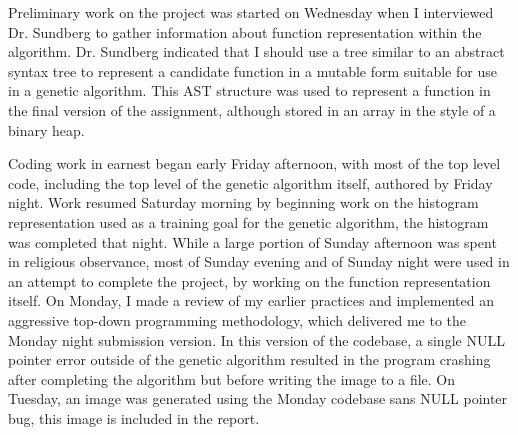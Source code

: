 \documentclass{article}
\begin{document}


Preliminary work on the project was started on Wednesday when I interviewed Dr. Sundberg to gather information about function representation within the algorithm.
Dr. Sundberg indicated that I should use a tree similar to an abstract syntax tree to represent a candidate function in a mutable form suitable for use in a genetic algorithm.
This AST structure was used to represent a function in the final version of the assignment, although stored in an array in the style of a binary heap.

Coding work in earnest began early Friday afternoon, with most of the top level code, including the top level of the genetic algorithm itself, authored by Friday night.
Work resumed Saturday morning by beginning work on the histogram representation used as a training goal for the genetic algorithm, the histogram was completed that night.
While a large portion of Sunday afternoon was spent in religious observance, most of Sunday evening and of Sunday night were used in an attempt to complete the project, by working on the function representation itself.
On Monday, I made a review of my earlier practices and implemented an aggressive top-down programming methodology, which delivered me to the Monday night submission version.
In this version of the codebase, a single NULL pointer error outside of the genetic algorithm resulted in the program crashing after completing the algorithm but before writing the image to a file.
On Tuesday, an image was generated using the Monday codebase sans NULL pointer bug, this image is included in the report.       

\end{document}
